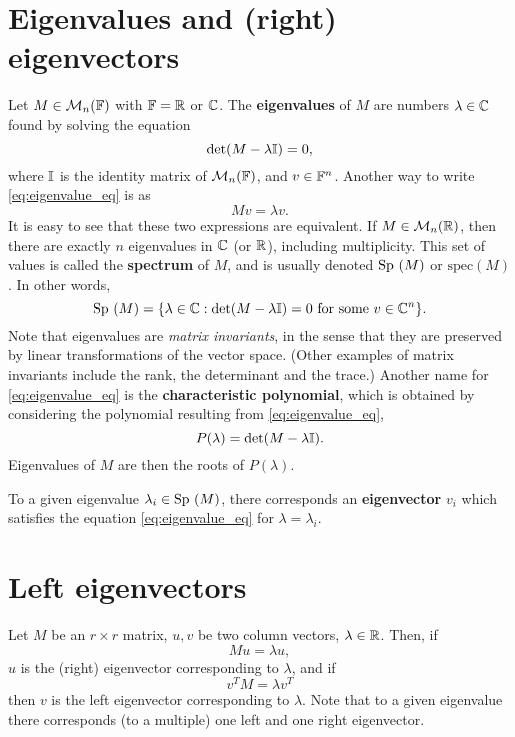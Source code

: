 \section{Eigenvalues and (right) eigenvectors}
Let $M\in\mathcal{M}_n(\mathbb{F})$ with $\mathbb{F}=\mathbb{R}$ or $\mathbb{C}$. The \textbf{eigenvalues} of $M$ are numbers $\lambda\in\mathbb{C}$ found by solving the equation
\begin{equation}\label{eq:eigenvalue_eq}
\det(M-\lambda\mathbb{I})=0,
\end{equation}
where $\mathbb{I}$ is the identity matrix of $\mathcal{M}_n(\mathbb{F})$, and $v\in\mathbb{F}^n$. Another way to write \eqref{eq:eigenvalue_eq} is as
\[
Mv=\lambda v.
\]
It is easy to see that these two expressions are equivalent. If $M\in\mathcal{M}_n(\mathbb{R})$, then there are exactly $n$ eigenvalues in $\mathbb{C}$ (or $\mathbb{R}$), including multiplicity. This set of values is called the \textbf{spectrum} of $M$, and is usually denoted $\textrm{Sp }(M)$ or $\textrm{spec}(M)$. In other words,
\[
\textrm{Sp }(M)=\{\lambda\in\mathbb{C}:\det(M-\lambda\mathbb{I})=0\textrm{ for some }v\in\mathbb{C}^n\}.
\]
Note that eigenvalues are \emph{matrix invariants}, in the sense that they are preserved by linear transformations of the vector space. (Other examples of matrix invariants include the rank, the determinant and the trace.)
Another name for \eqref{eq:eigenvalue_eq} is the \textbf{characteristic polynomial}, which is obtained by considering the polynomial resulting from \eqref{eq:eigenvalue_eq},
\[
P(\lambda)=\det(M-\lambda\mathbb{I}).
\]
Eigenvalues of $M$ are then the roots of $P(\lambda)$.

To a given eigenvalue $\lambda_i\in\textrm{Sp }(M)$, there corresponds an \textbf{eigenvector} $v_i$ which satisfies the equation \eqref{eq:eigenvalue_eq} for $\lambda=\lambda_i$.


\section{Left eigenvectors}
Let $M$ be an $r\times r$ matrix, $u,v$ be two column vectors, $\lambda\in\mathbb{R}$. Then, if  
\[
Mu=\lambda u,
\]
$u$ is the (right) eigenvector corresponding to $\lambda$, and if
\[
v^TM=\lambda v^T
\]
then $v$ is the left eigenvector corresponding to $\lambda$. Note that to a given eigenvalue there corresponds (to a multiple) one left and one right eigenvector.


